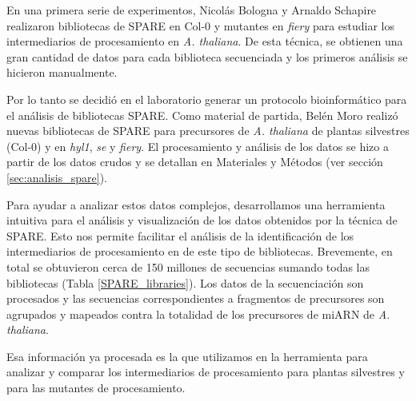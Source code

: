 En una primera serie de experimentos, Nicolás Bologna y Arnaldo Schapire realizaron bibliotecas de SPARE en Col-0 y mutantes en \textit{fiery} para estudiar los intermediarios de procesamiento en \textit{A. thaliana}.
De esta técnica, se obtienen una gran cantidad de datos para cada biblioteca secuenciada y los primeros análisis se hicieron manualmente.

Por lo tanto se decidió en el laboratorio generar un protocolo bioinformático para el análisis de bibliotecas SPARE. 
Como material de partida, Belén Moro realizó nuevas bibliotecas de SPARE para precursores de \textit{A. thaliana} de plantas silvestres (Col-0) y en \textit{hyl1}, \textit{se} y \textit{fiery}.
El procesamiento y análisis de los datos se hizo a partir de los datos crudos y se detallan en Materiales y Métodos (ver sección \ref{sec:analisis_spare}).

Para ayudar a analizar estos datos complejos, desarrollamos una herramienta intuitiva para el análisis y visualización de los datos obtenidos por la técnica de SPARE.
Esto nos permite facilitar el análisis de la identificación de los intermediarios de procesamiento en de este tipo de bibliotecas.
Brevemente, en total se obtuvieron cerca de 150 millones de secuencias sumando todas las bibliotecas (Tabla \ref{SPARE_libraries}).
Los datos de la secuenciación son procesados y las secuencias correspondientes a fragmentos de precursores son agrupados y mapeados contra la totalidad de los precursores de miARN de \textit{A. thaliana}.

Esa información ya procesada es la que utilizamos en la herramienta para analizar y comparar los intermediarios de procesamiento para plantas silvestres y para las mutantes de procesamiento.

